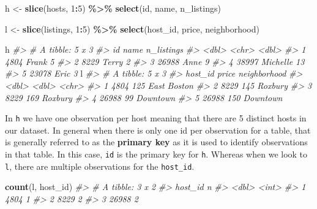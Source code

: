\documentclass[
]{book}
\newenvironment{Shaded}{\begin{snugshade}}{\end{snugshade}}
\newcommand{\CommentTok}[1]{\textcolor[rgb]{0.56,0.35,0.01}{\textit{#1}}}
\newcommand{\DecValTok}[1]{\textcolor[rgb]{0.00,0.00,0.81}{#1}}
\newcommand{\KeywordTok}[1]{\textcolor[rgb]{0.13,0.29,0.53}{\textbf{#1}}}
\newcommand{\NormalTok}[1]{#1}
\newcommand{\OperatorTok}[1]{\textcolor[rgb]{0.81,0.36,0.00}{\textbf{#1}}}
\newcommand{\StringTok}[1]{\textcolor[rgb]{0.31,0.60,0.02}{#1}}
\begin{document}
\begin{Shaded}
\begin{Highlighting}[]
\NormalTok{h \textless{}{-}}\StringTok{ }\KeywordTok{slice}\NormalTok{(hosts, }\DecValTok{1}\OperatorTok{:}\DecValTok{5}\NormalTok{) }\OperatorTok{\%\textgreater{}\%}\StringTok{ }
\StringTok{  }\KeywordTok{select}\NormalTok{(id, name, n\_listings)}

\NormalTok{l \textless{}{-}}\StringTok{ }\KeywordTok{slice}\NormalTok{(listings, }\DecValTok{1}\OperatorTok{:}\DecValTok{5}\NormalTok{) }\OperatorTok{\%\textgreater{}\%}\StringTok{ }
\StringTok{  }\KeywordTok{select}\NormalTok{(host\_id, price, neighborhood)}

\NormalTok{h}
\CommentTok{\#\textgreater{} \# A tibble: 5 x 3}
\CommentTok{\#\textgreater{}      id name     n\_listings}
\CommentTok{\#\textgreater{}   \textless{}dbl\textgreater{} \textless{}chr\textgreater{}         \textless{}dbl\textgreater{}}
\CommentTok{\#\textgreater{} 1  4804 Frank             5}
\CommentTok{\#\textgreater{} 2  8229 Terry             2}
\CommentTok{\#\textgreater{} 3 26988 Anne              9}
\CommentTok{\#\textgreater{} 4 38997 Michelle         13}
\CommentTok{\#\textgreater{} 5 23078 Eric              3}
\NormalTok{l}
\CommentTok{\#\textgreater{} \# A tibble: 5 x 3}
\CommentTok{\#\textgreater{}   host\_id price neighborhood}
\CommentTok{\#\textgreater{}     \textless{}dbl\textgreater{} \textless{}dbl\textgreater{} \textless{}chr\textgreater{}       }
\CommentTok{\#\textgreater{} 1    4804   125 East Boston }
\CommentTok{\#\textgreater{} 2    8229   145 Roxbury     }
\CommentTok{\#\textgreater{} 3    8229   169 Roxbury     }
\CommentTok{\#\textgreater{} 4   26988    99 Downtown    }
\CommentTok{\#\textgreater{} 5   26988   150 Downtown}
\end{Highlighting}
\end{Shaded}

In \texttt{h} we have one observation per host meaning that there are 5 distinct hosts in our dataset. In general when there is only one id per observation for a table, that is generally referred to as the \textbf{primary key} as it is used to identify observations in that table. In this case, \texttt{id} is the primary key for \texttt{h}. Whereas when we look to \texttt{l}, there are multiple observations for the \texttt{host\_id}.

\begin{Shaded}
\begin{Highlighting}[]
\KeywordTok{count}\NormalTok{(l, host\_id)}
\CommentTok{\#\textgreater{} \# A tibble: 3 x 2}
\CommentTok{\#\textgreater{}   host\_id     n}
\CommentTok{\#\textgreater{}     \textless{}dbl\textgreater{} \textless{}int\textgreater{}}
\CommentTok{\#\textgreater{} 1    4804     1}
\CommentTok{\#\textgreater{} 2    8229     2}
\CommentTok{\#\textgreater{} 3   26988     2}
\end{Highlighting}
\end{Shaded}
\end{document}
